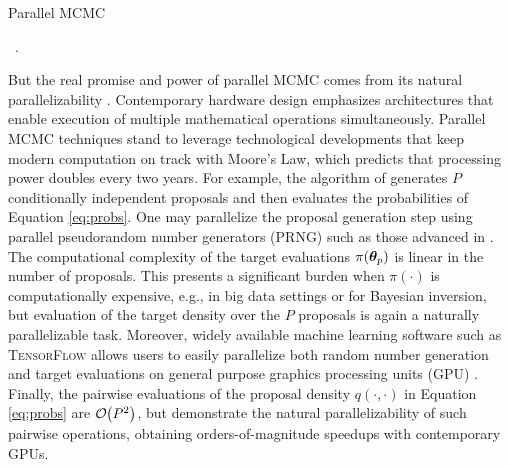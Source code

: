 \documentclass[12pt]{article} %
\newcommand{\order}[1]{{\cal O}\hspace{-0.2em}\left( #1 \right)}
\begin{document}
\begin{algorithm}[t!]
	\caption{Parallel MCMC \citep{tjelmeland2004using}}\label{alg:pMCMC}
	\ .
	\vspace{0.5em}
	
\end{algorithm}

But the real promise and power of parallel MCMC comes from its natural parallelizability \citep{calderhead2014general}.  Contemporary hardware design emphasizes architectures that enable execution of multiple mathematical operations simultaneously. Parallel MCMC techniques stand to leverage technological developments that keep modern computation on track with Moore's Law, which predicts that processing power doubles every two years.  For example, the algorithm of \citet{tjelmeland2004using} generates $P$ conditionally independent proposals and then evaluates the probabilities of Equation \eqref{eq:probs}.  One may parallelize the proposal generation step using parallel pseudorandom number generators (PRNG) such as those advanced in \citet{salmon2011parallel}. The computational complexity of the target evaluations $\pi(\boldsymbol{\theta}_p)$ is linear in the number of proposals. This presents a significant burden when $\pi(\cdot)$ is computationally expensive, e.g., in big data settings or for Bayesian inversion, but evaluation of the target density over the $P$ proposals is again a naturally parallelizable task.  Moreover, widely available machine learning software such as \textsc{TensorFlow} allows users to easily parallelize both random number generation and target evaluations on general purpose graphics processing units (GPU) \citep{lao2020tfp}. Finally, the pairwise evaluations of the proposal density $q(\cdot,\cdot)$ in Equation \eqref{eq:probs} are $\order{P^2}$, but \citet{massive} demonstrate the natural parallelizability of such pairwise operations, obtaining orders-of-magnitude speedups with contemporary GPUs.
\end{document}
